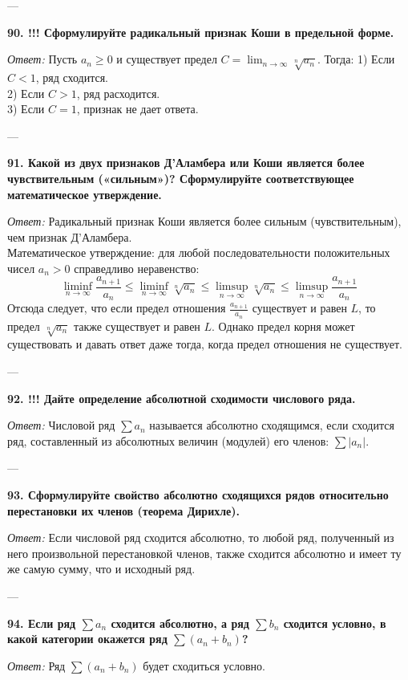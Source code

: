 \documentclass{article}
\begin{document}
---

\textbf{90. !!! Сформулируйте радикальный признак Коши в предельной форме.}

\textit{Ответ:} Пусть $a_n \ge 0$ и существует предел $C = \lim_{n \to \infty} \sqrt[n]{a_n}$. Тогда:
1) Если $C < 1$, ряд сходится. \\
2) Если $C > 1$, ряд расходится. \\
3) Если $C = 1$, признак не дает ответа.

---

\textbf{91. Какой из двух признаков Д'Аламбера или Коши является более чувствительным («сильным»)? Сформулируйте соответствующее математическое утверждение.}

\textit{Ответ:} Радикальный признак Коши является более сильным (чувствительным), чем признак Д'Аламбера. \\
Математическое утверждение: для любой последовательности положительных чисел $a_n > 0$ справедливо неравенство:
$$ \liminf_{n \to \infty} \frac{a_{n+1}}{a_n} \le \liminf_{n \to \infty} \sqrt[n]{a_n} \le \limsup_{n \to \infty} \sqrt[n]{a_n} \le \limsup_{n \to \infty} \frac{a_{n+1}}{a_n} $$
Отсюда следует, что если предел отношения $\frac{a_{n+1}}{a_n}$ существует и равен $L$, то предел $\sqrt[n]{a_n}$ также существует и равен $L$. Однако предел корня может существовать и давать ответ даже тогда, когда предел отношения не существует.

---

\textbf{92. !!! Дайте определение абсолютной сходимости числового ряда.}

\textit{Ответ:} Числовой ряд $\sum a_n$ называется абсолютно сходящимся, если сходится ряд, составленный из абсолютных величин (модулей) его членов: $\sum |a_n|$.

---

\textbf{93. Сформулируйте свойство абсолютно сходящихся рядов относительно перестановки их членов (теорема Дирихле).}

\textit{Ответ:} Если числовой ряд сходится абсолютно, то любой ряд, полученный из него произвольной перестановкой членов, также сходится абсолютно и имеет ту же самую сумму, что и исходный ряд.

---

\textbf{94. Если ряд $\sum a_{n}$ сходится абсолютно, а ряд $\sum b_{n}$ сходится условно, в какой категории окажется ряд $\sum(a_{n}+b_{n})$?}

\textit{Ответ:} Ряд $\sum(a_n + b_n)$ будет сходиться условно.
\end{document}

